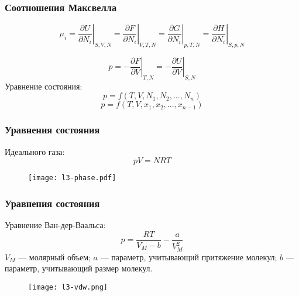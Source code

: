 \begin{frame}
\frametitle{Соотношения Максвелла}

\begin{equation}
\mu_i=\left.\dfrac{\partial U}{\partial N_i} \right|_{S,V,N} = \left.\dfrac{\partial F}{\partial N_i} \right|_{V,T,N} = \left.\dfrac{\partial G}{\partial N_i} \right|_{p,T,N}=\left.\dfrac{\partial H}{\partial N_i} \right|_{S,p,N}
\end{equation}

\begin{equation}
	p=-\left.\dfrac{\partial F}{\partial V}\right|_{T,N}=-\left.\dfrac{\partial U}{\partial V}\right|_{S,N}
\end{equation}
Уравнение состояния:
\begin{equation}
p=f(T,V,N_1,N_2,..., N_n)
\end{equation}
\begin{equation}
p=f(T,V,x_1,x_2,..., x_{n-1})
\end{equation}

\end{frame}

\begin{frame}
\frametitle{Уравнения состояния}
Идеального газа:
\begin{equation}
	pV=NRT
\end{equation}
\begin{figure}[h]
	\texttt{[image: l3-phase.pdf]}
\end{figure}

\end{frame}


\begin{frame}
\frametitle{Уравнения состояния}
Уравнение Ван-дер-Ваальса:
\begin{equation}
p=\dfrac{RT}{V_M -b}-\dfrac{a}{V_M^2}
\end{equation}
$V_M$ --- молярный объем; $a$ --- параметр, учитывающий притяжение молекул; $b$ --- параметр, учитывающий размер молекул.

\begin{figure}[h]
	\texttt{[image: l3-vdw.png]}
\end{figure}

\end{frame}

